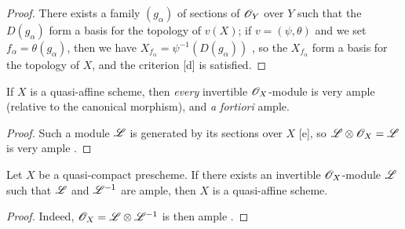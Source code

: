 \begin{proof}
\label{proof-II.5.1.3}
There exists a family $(g_\alpha)$ of sections of $\mathscr{O}_Y$ over $Y$ such that the $D(g_\alpha)$ form a basis for the topology of $v(X)$;
if $v=(\psi,\theta)$ and we set $f_\alpha=\theta(g_\alpha)$, then we have $X_{f_\alpha}=\psi^{-1}(D(g_\alpha))$ , so the $X_{f_\alpha}$ form a basis for the topology of $X$, and the criterion [d] is satisfied.
\end{proof}

\begin{corollary}[5.1.4]
\label{II.5.1.4}
If $X$ is a quasi-affine scheme, then \emph{every} invertible $\mathscr{O}_X$-module is very ample (relative to the canonical morphism), and \emph{a fortiori} ample.
\end{corollary}

\begin{proof}
\label{proof-II.5.1.4}
Such a module $\mathscr{L}$ is generated by its sections over $X$ [e], so $\mathscr{L}\otimes\mathscr{O}_X=\mathscr{L}$ is very ample .
\end{proof}

\begin{corollary}[5.1.5]
\label{II.5.1.5}
Let $X$ be a quasi-compact prescheme.
If there exists an invertible $\mathscr{O}_X$-module $\mathscr{L}$ such that $\mathscr{L}$ and $\mathscr{L}^{-1}$ are ample, then $X$ is a quasi-affine scheme.
\end{corollary}

\begin{proof}
\label{proof-II.5.1.5}
Indeed, $\mathscr{O}_X=\mathscr{L}\otimes\mathscr{L}^{-1}$ is then ample .
\end{proof}

